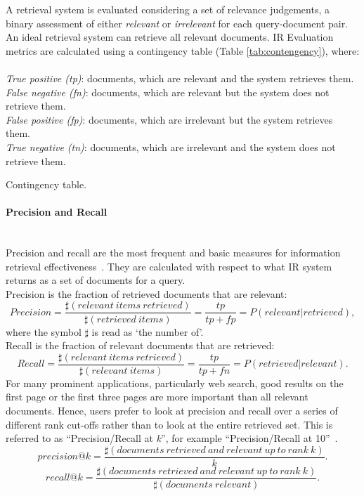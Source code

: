 A retrieval system is evaluated considering a set of relevance judgements, a binary assessment of either \textit{relevant} or \textit{irrelevant} for each query-document pair. An ideal retrieval system can retrieve all relevant documents. IR Evaluation metrics are calculated using a contingency table (Table \ref{tab:contengency}), where:\\\\
\textit{True positive (tp)}: documents, which are relevant and the system retrieves them.\\
\textit{False negative (fn)}: documents, which are relevant but the system does not retrieve them. \\
\textit{False positive (fp)}: documents, which are irrelevant but the system retrieves them.\\
\textit{True negative (tn)}: documents, which are irrelevant and the system does not retrieve them. 
\begin{table*}[t!]
  \centering
  
  \caption{Contingency table.}
  \label{tab:contengency}
\end{table*}
\FloatBarrier 
\paragraph{Precision and Recall}
\ \\
Precision and recall are the most frequent and basic measures for information retrieval effectiveness~\citep{manning2008introduction}. They are calculated with respect to what IR system returns as a set of documents for a query.\\
Precision is the fraction of retrieved documents that are relevant:
\[
Precision=\frac{\sharp(relevant \: items \: retrieved)}{\sharp(retrieved \: items)}=\frac{tp}{tp+fp}=P(relevant|retrieved),
\]
where the symbol $\sharp$ is read as `the number of'.\\
Recall is the fraction of relevant documents that are retrieved:
\[
Recall=\frac{\sharp(relevant \: items \: retrieved)}{\sharp(relevant \: items)}=\frac{tp}{tp+fn}=P(retrieved|relevant).
\]
For many prominent applications, particularly web search, good results on the first page or the first three pages are more important than all relevant documents. Hence, users prefer to look at precision and recall over a series of different rank cut-offs rather than to look at the entire retrieved set. This is referred to as ``Precision/Recall at \textit{k}'', for example ``Precision/Recall at 10''~\citep{manning2008introduction}. 
\begin{equation}
precision@k=\frac{\sharp(documents \: retrieved \: and \: relevant \: up \: to \: rank \: k)}{k}.
\end{equation}
\begin{equation}
recall@k=\frac{\sharp(documents \: retrieved \: and \: relevant \: up \: to \: rank \: k)}{\sharp(documents \: relevant)}.
\end{equation}
